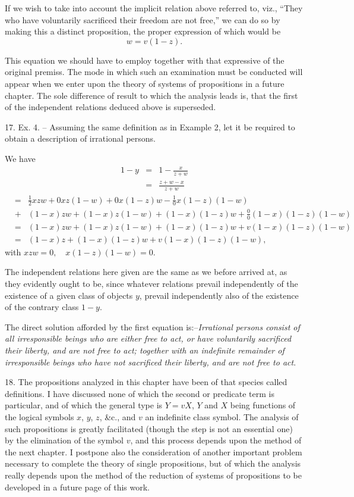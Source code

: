 \documentclass[oneside]{book}
\begin{document}
If we wish to take into account the implicit relation above
referred to, viz., ``They who have voluntarily sacrificed their
freedom are not free,'' we can do so by making this a distinct
proposition, the proper expression of which would be
\[
w = v (1 - z).
\]

This equation we should have to employ together with that
expressive of the original premiss. The mode in which such an
examination must be conducted will appear when we enter upon
the theory of systems of propositions in a future chapter. The
sole difference of result to which the analysis leads is, that the
first of the independent relations deduced above is superseded.

17. Ex. 4. -- Assuming the same definition as in Example 2,
let it be required to obtain a description of irrational persons.

We have
\begin{eqnarray*}
1-y &=& 1 - \frac{x}{z+w}\\
&=& \frac{z + w - x}{z + w}
\end{eqnarray*}
\begin{eqnarray*}
&=& \frac{1}{2} xzw + 0 xz (1 - w) + 0 x (1 - z) w - \frac{1}{0} x (1 - z) (1 - w)\\
&+& (1-x)zw + (1-x)z(1-w) + (1-x)(1-z)w + \frac{0}{0}(1-x)(1-z)(1-w)\\
&=& (1-x)zw + (1-x)z(1-w) + (1-x)(1-z)w + v(1-x)(1-z)(1-w)\\
&=& (1-x)z + (1-x)(1-z)w + v(1-x)(1-z)(1-w),
\end{eqnarray*}
with $xzw = 0, \quad x(1-z)(1-w) = 0$.

The independent relations here given are the same as we
before arrived at, as they evidently ought to be, since whatever
relations prevail independently of the existence of a given class
of objects $y$, prevail independently also of the existence of the
contrary class $1 - y$.

The direct solution afforded by the first equation is:--\textit{Irrational
persons consist of all irresponsible beings who are either free to
act, or have voluntarily sacrificed their liberty, and are not free to
act; together with an indefinite remainder of irresponsible beings
who have not sacrificed their liberty, and are not free to act}.

18. The propositions analyzed in this chapter have been of
that species called definitions. I have discussed none of which
the second or predicate term is particular, and of which the general
type is $Y= vX$, $Y$ and $X$ being functions of the logical
symbols $x$, $y$, $z$, \&c., and $v$ an indefinite class symbol. The analysis
of such propositions is greatly facilitated (though the step
is not an essential one) by the elimination of the symbol $v$, and
this process depends upon the method of the next chapter. I
postpone also the consideration of another important problem
necessary to complete the theory of single propositions, but of
which the analysis really depends upon the method of the reduction
of systems of propositions to be developed in a future page
of this work.
\end{document}
